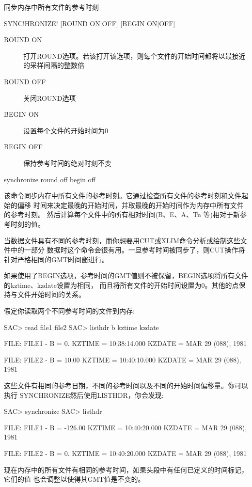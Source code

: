 \label{cmd:synchronize}

同步内存中所有文件的参考时刻

\begin{SACSTX}
SYNC!HRONIZE! [ROUND ON|OFF] [BEGIN ON|OFF]
\end{SACSTX}

\begin{description}
\item [ROUND ON] 打开ROUND选项。若该打开该选项，则每个文件的开始时间都将以最接近的采样间隔的整数倍
\item [ROUND OFF] 关闭ROUND选项 
\item [BEGIN ON] 设置每个文件的开始时间为0 
\item [BEGIN OFF] 保持参考时间的绝对时刻不变
\end{description}

\begin{SACDFT}
synchronize round off begin off
\end{SACDFT}

该命令同步内存中所有文件的参考时刻。它通过检查所有文件的参考时刻和文件起始的偏移
时间来决定最晚的开始时间，并取最晚的开始时间作为内存中所有文件的参考时刻。
然后计算每个文件中的所有相对时间(B、E、A、Tn 等)相对于新参考时刻的值。

当数据文件具有不同的参考时刻，而你想要用CUT或XLIM命令分析或绘制这些文件中的一部分
数据时这个命令会很有用。一旦参考时间被同步了，则CUT操作将针对严格相同的GMT时间窗进行。

如果使用了BEGIN选项，参考时间的GMT值则不被保留，BEGIN选项将所有文件的kztime、kzdate设置为相同，
而且将所有文件的开始时间设置为0。其他的点保持与文件开始时间的关系。

假定你读取两个不同参考时间的文件到内存:
\begin{SACCode}
SAC> read file1 file2
SAC> listhdr b kztime kzdate

  FILE: FILE1
  -
  B = 0.
  KZTIME = 10:38:14.000
  KZDATE = MAR 29 (088), 1981

  FILE: FILE2
  -
  B = 10.00
  KZTIME = 10:40:10.000
  KZDATE = MAR 29 (088), 1981
\end{SACCode}

这些文件有相同的参考日期，不同的参考时间以及不同的开始时间偏移量。你可以执行
SYNCHRONIZE然后使用LISTHDR，你会发现:
\begin{SACCode}
SAC> synchronize
SAC> listhdr

  FILE: FILE1
  -
  B = -126.00
  KZTIME = 10:40:20.000
  KZDATE = MAR 29 (088), 1981

  FILE: FILE2
  -
  B = 0.
  KZTIME = 10:40:20.000
  KZDATE = MAR 29 (088), 1981
\end{SACCode}
现在内存中的所有文件有相同的参考时间，如果头段中有任何已定义的时间标记，它们的值
也会调整以使得其GMT值是不变的。
